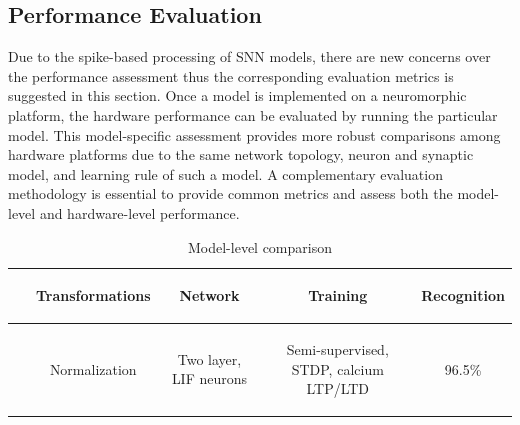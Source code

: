\documentclass{frontiersENG} %
\newenvironment{mycell}[1]
{
	\begin{minipage}{#1}
		\begin{center}
			\vspace*{0.15cm}
		}
		{
			\vspace*{0.1cm}
		\end{center}
	\end{minipage}
}
\begin{document}
\subsection{Performance Evaluation}
\label{sec:eval}
Due to the spike-based processing of SNN models, there are new concerns over the performance assessment thus the corresponding evaluation metrics is suggested in this section.
Once a model is implemented on a neuromorphic platform, the hardware performance can be evaluated by running the particular model.
This model-specific assessment provides more robust comparisons among hardware platforms due to the same network topology, neuron and synaptic model, and learning rule of such a model. 
A complementary evaluation methodology is essential to provide common metrics and assess both the model-level and hardware-level performance.
\begin{table}[hbt!]
	\caption{Model-level comparison}
	\begin{center}
		\bgroup
		\def\arraystretch{1.5}
		\begin{tabular}{ l c c c c }
			$ $ &
			\begin{mycell}{1.9cm} Transformations\end{mycell} & 
			\begin{mycell}{3.5cm} Network\end{mycell} & 
			\begin{mycell}{3.5cm} Training \end{mycell} & 
			\begin{mycell}{3.5cm} Recognition \end{mycell} \\
			\hline
			
			\begin{mycell}{2.5cm}~\cite{brader2007learning} \end{mycell} & 
			\begin{mycell}{1.9cm} Normalization \end{mycell} & %
			\begin{mycell}{3.5cm} Two layer, LIF neurons\end{mycell}&  %
			\begin{mycell}{3.5cm} Semi-supervised, STDP, calcium LTP/LTD\end{mycell}&  %
			\begin{mycell}{3.5cm} 96.5\% \end{mycell} \\%
			

\end{tabular}
\end{center}
\end{table}
\end{document}

